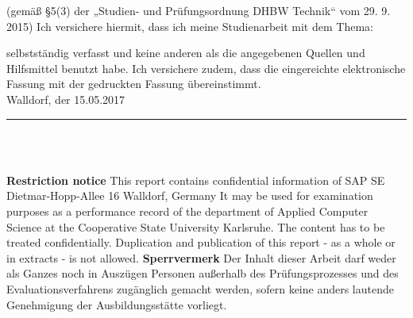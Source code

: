 \begin{spacing}{1.0}
(gemäß §5(3) der „Studien- und Prüfungsordnung DHBW Technik“ vom 29. 9. 2015)
Ich versichere hiermit, dass ich meine Studienarbeit mit dem Thema: 
\begin{quote}
	\textit{\titel} 
\end{quote}  
selbstständig verfasst und keine anderen als die angegebenen Quellen und Hilfsmittel benutzt habe. Ich versichere zudem, dass die eingereichte elektronische Fassung mit der gedruckten Fassung übereinstimmt. \\


Walldorf, der 15.05.2017 \\[4ex]

\rule[-0.2cm]{5cm}{0.5pt} \\

\textsc{\autor} \\[10ex]
\end{spacing}

\newpage 

{\bfseries Restriction notice} \newline
This report contains confidential information of \newline
SAP SE \newline
Dietmar-Hopp-Allee 16  Walldorf, Germany \newline
It may be used for examination purposes as a performance record of the department
of Applied Computer Science at the Cooperative State University Karlsruhe.
The content has to be treated confidentially. \newline
Duplication and publication of this report - as a whole or in extracts - is not
allowed. \newline
\vskip 1cm
\textbf{Sperrvermerk} \newline
Der Inhalt dieser Arbeit darf weder als Ganzes noch in Ausz{\"u}gen Personen 
au{\ss}erhalb des Pr{\"u}fungsprozesses und des Evaluationsverfahrens
zug{\"a}nglich gemacht werden, sofern keine anders lautende Genehmigung der Ausbildungsst{\"a}tte vorliegt.